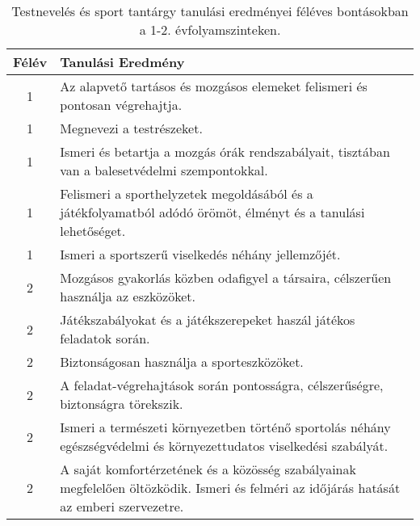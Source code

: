        
           \begin{longtable}{c | p{} }
            \caption[Testnevelés és sport 1-2.]{Testnevelés és sport tantárgy tanulási eredményei féléves bontásokban a 1-2. évfolyamszinteken. }  \\

            \textbf{Félév} & \textbf{Tanulási Eredmény} \\
            \hline
            \endhead
                                
                                          1 &  Az alapvető tartásos és mozgásos elemeket felismeri és pontosan végrehajtja. \\ \hline
                                          1 &  Megnevezi a testrészeket. \\ \hline
                                          1 &  Ismeri és betartja a mozgás órák rendszabályait, tisztában van a balesetvédelmi szempontokkal. \\ \hline
                                          1 &  Felismeri a sporthelyzetek megoldásából és a játékfolyamatból adódó örömöt, élményt és a tanulási lehetőséget. \\ \hline
                                          1 &  Ismeri a sportszerű viselkedés néhány jellemzőjét. \\ \hline
                                      
                                
                                          2 &  Mozgásos gyakorlás közben odafigyel a társaira, célszerűen használja az eszközöket. \\ \hline
                                          2 &  Játékszabályokat és a játékszerepeket haszál játékos feladatok során. \\ \hline
                                          2 &  Biztonságosan használja a sporteszközöket. \\ \hline
                                          2 &  A feladat-végrehajtások során pontosságra, célszerűségre, biztonságra törekszik. \\ \hline
                                          2 &  Ismeri a természeti környezetben történő sportolás néhány egészségvédelmi és környezettudatos viselkedési szabályát. \\ \hline
                                          2 &  A saját komfortérzetének és a közösség szabályainak megfelelően öltözködik. Ismeri és felméri az időjárás hatását az emberi szervezetre. \\ \hline
                                      

\end{longtable}
